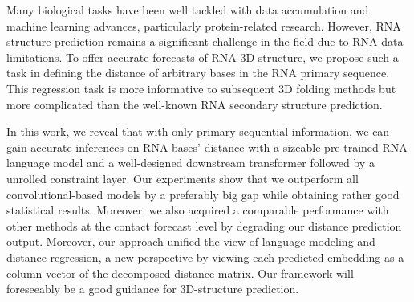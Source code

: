   Many biological tasks have been well tackled with data accumulation and machine learning advances, particularly protein-related research. However, RNA structure prediction remains a significant challenge in the field due to RNA data limitations. To offer accurate forecasts of RNA 3D-structure, we propose such a task in defining the distance of arbitrary bases in the RNA primary sequence. This regression task is more informative to subsequent 3D folding methods but more complicated than the well-known RNA secondary structure prediction. 

In this work, we reveal that with only primary sequential information, we can gain accurate inferences on RNA bases' distance with a sizeable pre-trained RNA language model and a well-designed downstream transformer followed by a unrolled constraint layer. Our experiments show that we outperform all convolutional-based models by a preferably big gap while obtaining rather good statistical results. Moreover, we also acquired a comparable performance with other methods at the contact forecast level by degrading our distance prediction output. Moreover, our approach unified the view of language modeling and distance regression, a new perspective by viewing each predicted embedding as a column vector of the decomposed distance matrix. Our framework will foreseeably be a good guidance for 3D-structure prediction.